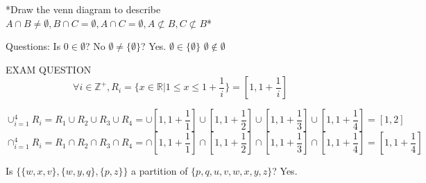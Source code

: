 \documentclass[12pt]{article}
\begin{document}
*Draw the venn diagram to describe \(A \cap B  \neq \emptyset, B \cap C = \emptyset, A \cap C = \emptyset, A \not\subset B, C \not\subset B\)*

Questions:
Is \( 0 \in \emptyset\)? No
\(\emptyset \neq \{\emptyset\}\)? Yes.
\(\emptyset \in \{\emptyset\}\)
\(\emptyset \notin \emptyset\)

EXAM QUESTION
\[\forall i \in \mathbb{Z}^+, R_i = \{x \in \mathbb{R} | 1 \leq x \leq 1 + \frac{1}{i}\} = [1, 1 + \frac{1}{i}]\]

\[\cup_{i = 1}^{4} R_i = R_1 \cup R_2 \cup R_3 \cup R_4 = \cup [1, 1 + \frac{1}{1}] \cup [1, 1 + \frac{1}{2}] \cup [1, 1 + \frac{1}{3}] \cup [1, 1 + \frac{1}{4}] = [1,2]\]
\[\cap_{i = 1}^{4} R_i = R_1 \cap R_2 \cap R_3 \cap R_4 = \cap [1, 1 + \frac{1}{1}] \cap [1, 1 + \frac{1}{2}] \cap [1, 1 + \frac{1}{3}] \cap [1, 1 + \frac{1}{4}] = [1, 1 + \frac{1}{4}]\]

Is \(\{\{w, x, v\}, \{w,y,q\}, \{p,z\}\}\) a partition of \(\{p,q,u,v,w,x,y,z\}\)? Yes.
\end{document}
